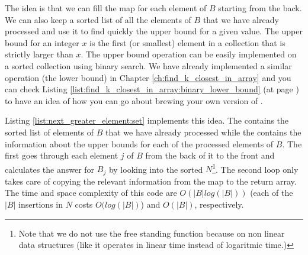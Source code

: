The idea is that we can fill the map for each element of $B$ starting from the back. We can also
keep a sorted list of all the elements of $B$ that we have already processed and use it to find
quickly the upper bound for a given value. The upper bound for an integer $x$ is the first (or
smallest) element in a collection that is strictly larger than $x$. The upper bound operation can be
easily implemented on a sorted collection using binary search. We have already implemented a similar operation (the lower bound)
in Chapter \ref{ch:find_k_closest_in_array} and you can check Listing \ref{list:find_k_closest_in_array:binary_lower_bound} (at page \pageref{list:find_k_closest_in_array:binary_lower_bound})
to have an idea of how you can go about brewing  your own version of .


Listing \ref{list:next_greater_element:set} implements this idea. The  contains the sorted list of
elements of $B$ that we have already processed while the 
contains the information about the upper bounds for each of the processed elements of $B$. The first
 goes through each element $j$ of $B$ from the back of it to the front and calculates
the answer for $B_j$ by looking into the sorted  $N$\footnote{Note that we do not
use the free standing function \href{https://en.cppreference.com/w/cpp/algorithm/upper_bound}{} because on non linear data structures (like
 it operates in linear time instead of logaritmic time.)}.
The second  loop only takes care of copying the relevant information from the map  to the return array.
The time and space complexity of this code are $O(|B|log(|B|))$ (each of the $|B|$ insertions in $N$ costs $O(log(|B|)$) and $O(|B|)$, respectively.



